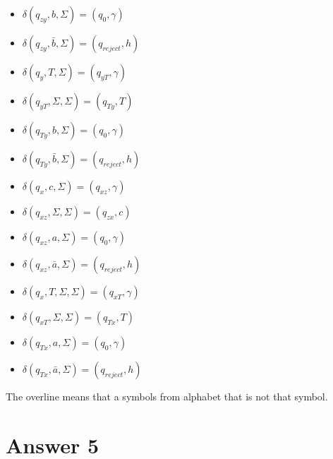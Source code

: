 \documentclass[12pt]{article}
\begin{document}
\begin{itemize}
	\item $\delta(q_{zy},b,\Sigma)=(q_0,\gamma)$
	\item $\delta(q_{zy},\bar{b},\Sigma) = (q_{reject},h)$
	\item $\delta(q_y,T,\Sigma)=(q_{yT},\gamma)$
	\item $\delta(q_{yT},\Sigma,\Sigma)=(q_{Ty},T)$
	\item $\delta(q_{Ty},b,\Sigma)=(q_0,\gamma)$
	\item $\delta(q_{Ty},\bar{b},\Sigma)=(q_{reject},h)$
	\item $\delta(q_x,c,\Sigma)=(q_{xz},\gamma)$
	\item $\delta(q_{xz},\Sigma,\Sigma) = (q_{zx},c)$
	\item $\delta(q_{xz},a,\Sigma)=(q_0,\gamma)$
	\item $\delta(q_{xz},\bar{a},\Sigma) = (q_{reject},h)$
	\item $\delta(q_x,T,\Sigma,\Sigma) = (q_{xT},\gamma)$
	\item $\delta(q_{xT},\Sigma,\Sigma) = (q_{Tx},T)$
	\item $\delta(q_{Tx},a,\Sigma) = (q_0,\gamma)$
	\item $\delta(q_{Tx},\bar{a},\Sigma) = (q_{reject},h)$
	
\end{itemize}
The overline means that a symbols from alphabet that is not that symbol.


\section*{Answer 5}
\end{document}
